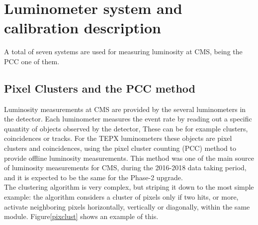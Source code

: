 \chapter{ Luminometer system and calibration description}


A total of seven systems are used for measuring luminosity at CMS, being the PCC one of them. 




\section{Pixel Clusters and the PCC method}

Luminosity measurements at CMS are provided by the several luminometers in the detector.
Each luminometer measures the event rate by reading out a specific quantity of objects observed by the detector, These can be for example clusters, coincidences or tracks. For the TEPX luminometers these objects are pixel clusters and coincidences, using the pixel cluster counting (PCC) method to provide offline luminosity measurements. This method was one of the main source of luminosity measurements for CMS, during the 2016-2018 data taking period, and it is expected to be the same for the Phase-2 upgrade.\\
The clustering algorithm is very complex, but striping it down to the most simple example: the algorithm considers a cluster of pixels only if two hits, or more,  activate neighboring pixels horizontally, vertically or diagonally, within the same module. Figure\ref{pixclust} shows an example of this.
